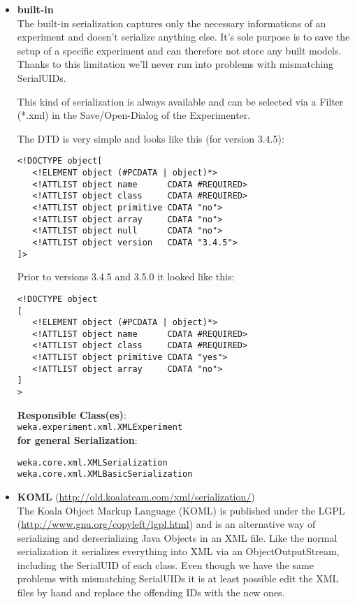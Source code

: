 \begin{itemize}
\item \textbf{built-in}\\
The built-in serialization captures only the necessary informations of
an experiment and doesn't serialize anything else. It's sole purpose
is to save the setup of a specific experiment and can therefore not
store any built models. Thanks to this limitation we'll never run into
problems with mismatching SerialUIDs.

This kind of serialization is always available and can be selected via
a Filter (*.xml) in the Save/Open-Dialog of the Experimenter.

The DTD is very simple and looks like this (for version 3.4.5): 

\begin{verbatim}
<!DOCTYPE object[
   <!ELEMENT object (#PCDATA | object)*>
   <!ATTLIST object name      CDATA #REQUIRED>
   <!ATTLIST object class     CDATA #REQUIRED>
   <!ATTLIST object primitive CDATA "no">
   <!ATTLIST object array     CDATA "no">   
   <!ATTLIST object null      CDATA "no">   
   <!ATTLIST object version   CDATA "3.4.5">
]>
\end{verbatim}

\noindent Prior to versions 3.4.5 and 3.5.0 it looked like this: 

\begin{verbatim}
<!DOCTYPE object
[
   <!ELEMENT object (#PCDATA | object)*>
   <!ATTLIST object name      CDATA #REQUIRED>
   <!ATTLIST object class     CDATA #REQUIRED>
   <!ATTLIST object primitive CDATA "yes">
   <!ATTLIST object array     CDATA "no">
]
>
\end{verbatim}

\noindent \textbf{Responsible Class(es)}:\\

\verb=weka.experiment.xml.XMLExperiment=\\

\noindent \textbf{for general Serialization}:

\begin{verbatim}
weka.core.xml.XMLSerialization
weka.core.xml.XMLBasicSerialization 
\end{verbatim}

\newpage
\item \textbf{KOML} (\url{http://old.koalateam.com/xml/serialization/}{})\\
The Koala Object Markup Language (KOML) is published under the LGPL
(\url{http://www.gnu.org/copyleft/lgpl.html}{}) and is an alternative way of
serializing and derserializing Java Objects in an XML file. Like the
normal serialization it serializes everything into XML via an
ObjectOutputStream, including the SerialUID of each class. Even though
we have the same problems with mismatching SerialUIDs it is at least
possible edit the XML files by hand and replace the offending IDs with
the new ones.


\end{itemize}
